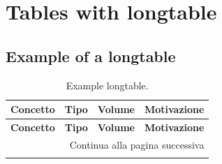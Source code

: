 \chapter{Tables with longtable}

\section{Example of a longtable}

\begin{longtable}{|l|c|c|p{6.2cm}|}
    \caption{Example longtable.}
    \label{tab:longtable_example} \\

    \hline
    \textbf{Concetto} & \textbf{Tipo} & \textbf{Volume} & \textbf{Motivazione} \\
    \hline
    \endfirsthead

    \hline
    \textbf{Concetto} & \textbf{Tipo} & \textbf{Volume} & \textbf{Motivazione} \\
    \hline
    \endhead

    \hline
    \multicolumn{4}{|r|}{Continua alla pagina successiva} \\
    \hline
    \endfoot

    \hline
    \endlastfoot


\end{longtable}
